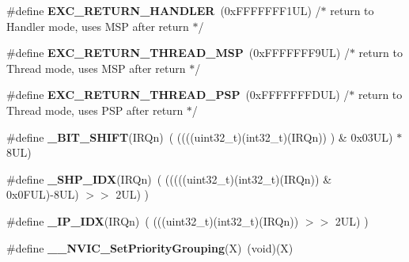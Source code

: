 \begin{DoxyCompactItemize}
\#define {\bfseries E\+X\+C\+\_\+\+R\+E\+T\+U\+R\+N\+\_\+\+H\+A\+N\+D\+L\+ER}~(0x\+F\+F\+F\+F\+F\+F\+F1\+U\+L)     /$\ast$ return to Handler mode, uses M\+S\+P after return                               $\ast$/
\item 
\mbox{\label{group___c_m_s_i_s___core___n_v_i_c_functions_gaea4703101b5e679f695e231f7ee72331}} 
\#define {\bfseries E\+X\+C\+\_\+\+R\+E\+T\+U\+R\+N\+\_\+\+T\+H\+R\+E\+A\+D\+\_\+\+M\+SP}~(0x\+F\+F\+F\+F\+F\+F\+F9\+U\+L)     /$\ast$ return to Thread mode, uses M\+S\+P after return                                $\ast$/
\item 
\mbox{\label{group___c_m_s_i_s___core___n_v_i_c_functions_ga9998daf0fbdf31dbc8f81cd604b58175}} 
\#define {\bfseries E\+X\+C\+\_\+\+R\+E\+T\+U\+R\+N\+\_\+\+T\+H\+R\+E\+A\+D\+\_\+\+P\+SP}~(0x\+F\+F\+F\+F\+F\+F\+F\+D\+U\+L)     /$\ast$ return to Thread mode, uses P\+S\+P after return                                $\ast$/
\item 
\mbox{\label{group___c_m_s_i_s___core___n_v_i_c_functions_ga53c75b28823441c6153269f0ecbed878}} 
\#define {\bfseries \+\_\+\+B\+I\+T\+\_\+\+S\+H\+I\+FT}(I\+R\+Qn)~(  ((((uint32\+\_\+t)(int32\+\_\+t)(I\+R\+Qn))         )      \&  0x03\+U\+L) $\ast$ 8\+U\+L)
\item 
\mbox{\label{group___c_m_s_i_s___core___n_v_i_c_functions_gaee4f7eb5d7e770ad51489dbceabb1755}} 
\#define {\bfseries \+\_\+\+S\+H\+P\+\_\+\+I\+DX}(I\+R\+Qn)~( (((((uint32\+\_\+t)(int32\+\_\+t)(I\+R\+Qn)) \& 0x0\+F\+U\+L)-\/8\+U\+L) $>$$>$    2\+U\+L)      )
\item 
\mbox{\label{group___c_m_s_i_s___core___n_v_i_c_functions_ga370ec4b1751a6a889d849747df3763a9}} 
\#define {\bfseries \+\_\+\+I\+P\+\_\+\+I\+DX}(I\+R\+Qn)~(   (((uint32\+\_\+t)(int32\+\_\+t)(I\+R\+Qn))                $>$$>$    2\+U\+L)      )
\item 
\mbox{\label{group___c_m_s_i_s___core___n_v_i_c_functions_ga6834dd8c9c59394f1b544b57665293a4}} 
\#define {\bfseries \+\_\+\+\_\+\+N\+V\+I\+C\+\_\+\+Set\+Priority\+Grouping}(X)~(void)(X)

\end{DoxyCompactItemize}
